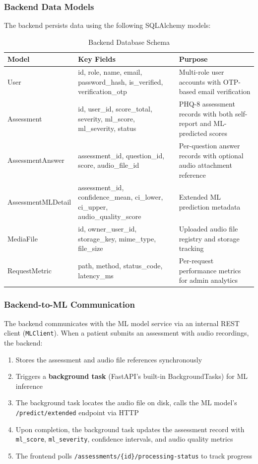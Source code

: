 \documentclass[12pt]{article}
\begin{document}
	\subsubsection{Backend Data Models}

	The backend persists data using the following SQLAlchemy models:

	\begin{table}[H]
		\centering
		\caption{Backend Database Schema}
		\small
		\begin{tabular}{|l|l|p{7cm}|}
			\hline
			\textbf{Model} & \textbf{Key Fields} & \textbf{Purpose} \\ \hline
			User & id, role, name, email, password\_hash, is\_verified, verification\_otp & Multi-role user accounts with OTP-based email verification \\ \hline
			Assessment & id, user\_id, score\_total, severity, ml\_score, ml\_severity, status & PHQ-8 assessment records with both self-report and ML-predicted scores \\ \hline
			AssessmentAnswer & assessment\_id, question\_id, score, audio\_file\_id & Per-question answer records with optional audio attachment reference \\ \hline
			AssessmentMLDetail & assessment\_id, confidence\_mean, ci\_lower, ci\_upper, audio\_quality\_score & Extended ML prediction metadata \\ \hline
			MediaFile & id, owner\_user\_id, storage\_key, mime\_type, file\_size & Uploaded audio file registry and storage tracking \\ \hline
			RequestMetric & path, method, status\_code, latency\_ms & Per-request performance metrics for admin analytics \\ \hline
		\end{tabular}
	\end{table}

	\subsubsection{Backend-to-ML Communication}

	The backend communicates with the ML model service via an internal REST client (\texttt{MLClient}). When a patient submits an assessment with audio recordings, the backend:

	\begin{enumerate}
		\item Stores the assessment and audio file references synchronously
		\item Triggers a \textbf{background task} (FastAPI's built-in BackgroundTasks) for ML inference
		\item The background task locates the audio file on disk, calls the ML model's \texttt{/predict/extended} endpoint via HTTP
		\item Upon completion, the background task updates the assessment record with \texttt{ml\_score}, \texttt{ml\_severity}, confidence intervals, and audio quality metrics
		\item The frontend polls \texttt{/assessments/\{id\}/processing-status} to track progress
	\end{enumerate}
\end{document}
